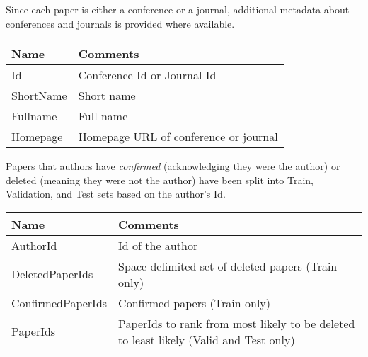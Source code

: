 Since each paper is either a conference or a journal, additional metadata about conferences and journals is provided where available.

\begin{tabular}{| l | p{8cm} |} \hline
Name & Comments  \\ \hline
Id & Conference Id or Journal Id  \\ \hline
ShortName & Short name  \\ \hline
Fullname & Full name  \\ \hline
Homepage & Homepage URL of conference or journal  \\ \hline
\end{tabular}


Papers that authors have \emph{confirmed} (acknowledging they were the author) or deleted (meaning they were not the author) have been split into Train, Validation, and Test sets based on the author's Id. 

\begin{tabular}{| l | p{8cm} |} \hline
Name & Comments  \\ \hline
AuthorId & Id of the author \\ \hline
DeletedPaperIds & Space-delimited set of deleted papers (Train only)  \\ \hline
ConfirmedPaperIds  & Confirmed papers (Train only)  \\ \hline
PaperIds & PaperIds to rank from most likely to be deleted to least likely (Valid and Test only)  \\ \hline
\end{tabular}